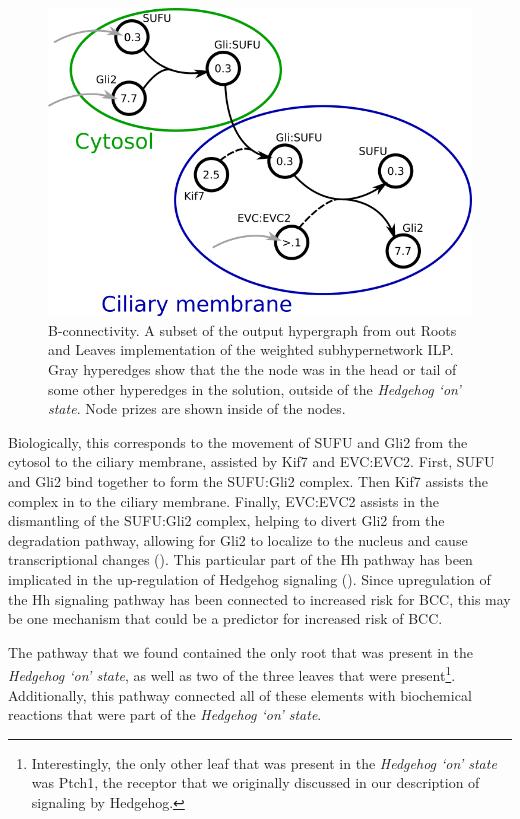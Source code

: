 \documentclass[12pt,twoside]{reedthesis}
\theoremstyle{definition}
\begin{document}
    \begin{figure}[!h]
      \begin{center}
        \includegraphics[width=\textwidth]{Hh-signaling-output}
      \caption[B-connectivity.]{B-connectivity. A subset of the output hypergraph from out Roots and Leaves implementation of the weighted subhypernetwork ILP. Gray hyperedges show that the the node was in the head or tail of some other hyperedges in the solution, outside of the \textit{Hedgehog `on' state}. Node prizes are shown inside of the nodes.}
      \label{fig:Hh-signaling-output}
      \end{center}
    \end{figure}

    Biologically, this corresponds to the movement of SUFU and Gli2 from the cytosol to the ciliary membrane, assisted by Kif7 and EVC:EVC2. First, SUFU and Gli2 bind together to form the SUFU:Gli2 complex. Then Kif7 assists the complex in to the ciliary membrane. Finally, EVC:EVC2 assists in the dismantling of the SUFU:Gli2 complex, helping to divert Gli2 from the degradation pathway, allowing for Gli2 to localize to the nucleus and cause transcriptional changes (\cite{Humke2010}). This particular part of the Hh pathway has been implicated in the up-regulation of Hedgehog signaling (\cite{Tukachinsky2010}). Since upregulation of the Hh signaling pathway has been connected to increased risk for BCC, this may be one mechanism that could be a predictor for increased risk of BCC.\par

    The pathway that we found contained the only root that was present in the \textit{Hedgehog `on' state}, as well as two of the three leaves that were present\footnote{Interestingly, the only other leaf that was present in the \textit{Hedgehog `on' state} was Ptch1, the receptor that we originally discussed in our description of signaling by Hedgehog.}. Additionally, this pathway connected all of these elements with biochemical reactions that were part of the \textit{Hedgehog `on' state}.\par
\end{document}
